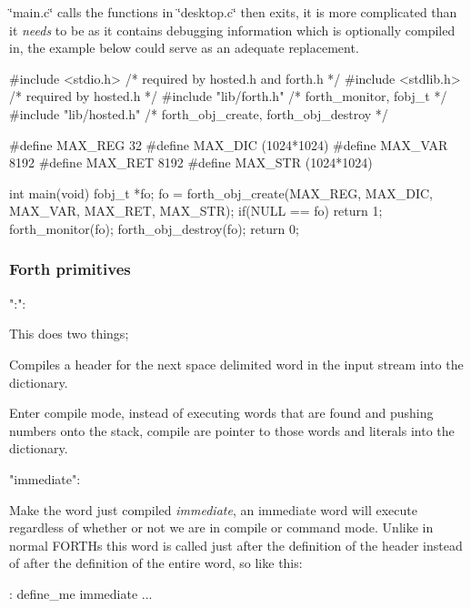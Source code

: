 \char`\"{}main.\-c\char`\"{} calls the functions in \char`\"{}desktop.\-c\char`\"{} then exits, it is more complicated than it {\itshape needs} to be as it contains debugging information which is optionally compiled in, the example below could serve as an adequate replacement. \begin{DoxyVerb}#include <stdio.h>      /* required by hosted.h and forth.h */
#include <stdlib.h>     /* required by hosted.h */
#include "lib/forth.h"  /* forth_monitor, fobj_t */
#include "lib/hosted.h" /* forth_obj_create, forth_obj_destroy */

#define MAX_REG 32
#define MAX_DIC (1024*1024)
#define MAX_VAR 8192
#define MAX_RET 8192
#define MAX_STR (1024*1024)

int main(void){
    fobj_t *fo;
    fo = forth_obj_create(MAX_REG, MAX_DIC, MAX_VAR, MAX_RET, MAX_STR);
    if(NULL == fo)
      return 1;
    forth_monitor(fo);
    forth_obj_destroy(fo);
    return 0;
}
\end{DoxyVerb}


\subsubsection*{Forth primitives}

\begin{DoxyVerb}  ":": 
\end{DoxyVerb}


This does two things;


\begin{DoxyEnumerate}
\item Compiles a header for the next space delimited word in the input stream into the dictionary.
\item Enter compile mode, instead of executing words that are found and pushing numbers onto the stack, compile are pointer to those words and literals into the dictionary. \begin{DoxyVerb}   "immediate":
\end{DoxyVerb}

\end{DoxyEnumerate}

Make the word just compiled {\itshape immediate}, an immediate word will execute regardless of whether or not we are in compile or command mode. Unlike in normal F\-O\-R\-T\-Hs this word is called just after the definition of the header instead of after the definition of the entire word, so like this\-: \begin{DoxyVerb}: define_me immediate ...
\end{DoxyVerb}



